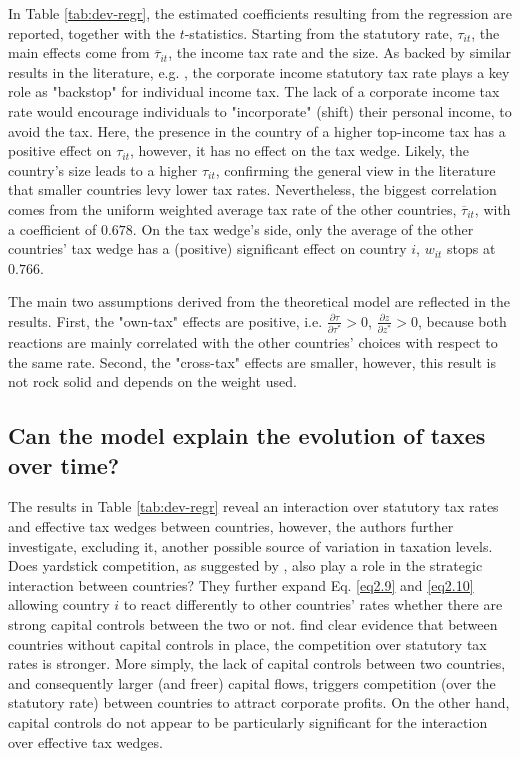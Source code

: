 In Table \ref{tab:dev-regr}, the estimated coefficients resulting from the regression are reported, together with the $t$-statistics. Starting from the statutory rate, $\tau_{it}$, the main effects come from $\overline{\tau}_{it}$, the income tax rate and the size. As backed by similar results in the literature, e.g. \textcite{slemrod}, the corporate income statutory tax rate plays a key role as "backstop" for individual income tax. The lack of a corporate income tax rate would encourage individuals to "incorporate" (shift) their personal income, to avoid the tax. Here, the presence in the country of a higher top-income tax has a positive effect on $\tau_{it}$, however, it has no effect on the tax wedge. Likely, the country's size leads to a higher $\tau_{it}$, confirming the general view in the literature that smaller countries levy lower tax rates. Nevertheless, the biggest correlation comes from the uniform weighted average tax rate of the other countries, $\overline{\tau}_{it}$, with a coefficient of $0.678$. On the tax wedge's side, only the average of the other countries' tax wedge has a (positive) significant effect on country $i$, $w_{it}$ stops at $0.766$.

The main two assumptions derived from the theoretical model are reflected in the results. First, the "own-tax" effects are positive, i.e. $\frac{\partial \tau}{\partial \tau^*}>0$, $\frac{\partial z}{\partial z^*}>0$, because both reactions are mainly correlated with the other countries' choices with respect to the same rate. Second, the "cross-tax" effects are smaller, however, this result is not rock solid and depends on the weight used.

\vspace{-5pt}
\subsection{Can the model explain the evolution of taxes over time?}

The results in Table \ref{tab:dev-regr} reveal an interaction over statutory tax rates and effective tax wedges between countries, however, the authors further investigate, excluding it, another possible source of variation in taxation levels. Does yardstick competition, as suggested by \textcite{besley}, also play a role in the strategic interaction between countries? They further expand Eq. \ref{eq2.9} and \ref{eq2.10} allowing country $i$ to react differently to other countries' rates whether there are strong capital controls between the two or not. \textcite{dev-loc-red-08} find clear evidence that between countries without capital controls in place, the competition over statutory tax rates is stronger. More simply, the lack of capital controls between two countries, and consequently larger (and freer) capital flows, triggers competition (over the statutory rate) between countries to attract corporate profits. On the other hand, capital controls do not appear to be particularly significant for the interaction over effective tax wedges.

